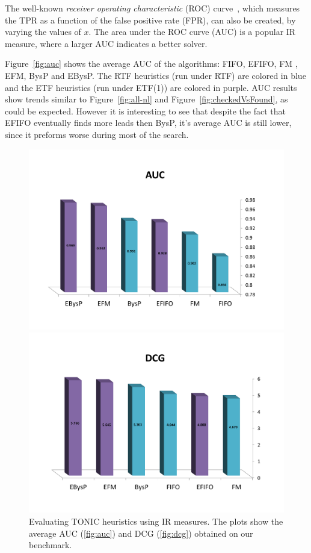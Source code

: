 \documentclass[journal]{IEEEtran}
\newcommand{\islead}[1]{{\em IsLead(#1)}}
\newcommand{\newstuff}[1]{#1}
\begin{document}
\newstuff{
The well-known {\em receiver operating characteristic} (ROC) curve~\cite{croft2010search}, which measures the TPR as a function of the false positive rate (FPR), can also be created, by varying the values of \(x\). 
The area under the ROC curve (AUC) is a popular IR measure, where a larger AUC indicates a better solver. 
}

Figure~\ref{fig:auc} shows the average AUC of the algorithms: FIFO, EFIFO, FM , EFM, BysP and EBysP. The RTF heuristics (run under RTF)  are colored in blue and the ETF heuristics (run under ETF(1)) are colored in purple. AUC results show trends similar to Figure~\ref{fig:all-nl} and Figure~\ref{fig:checkedVsFound}, as could be expected. However it is interesting to see that despite the fact that EFIFO eventually finds more leads then BysP, it's average AUC is still lower, since it preforms worse during most of the search.









\begin{figure}
\centering
\begin{subfloat}[\label{fig:auc}]
  \centering
\includegraphics[width=.4\textwidth,  trim={2.0cm 2.5cm 2.5cm 5.5cm},clip]{AUC_ALL.pdf}
\end{subfloat}%
\quad
\begin{subfloat}[\label{fig:dcg}]
  \centering
\includegraphics[width=.4\textwidth,  trim={2.0cm 2.5cm 2.5cm 5.5cm},clip]{DCG_AllAlgo.pdf}
\end{subfloat}
\caption{Evaluating TONIC heuristics using IR measures. The plots show the average AUC (\ref{fig:auc}) and DCG (\ref{fig:dcg}) obtained on our benchmark.}
\label{fig:auc-and-dcg}
\end{figure}
\end{document}
